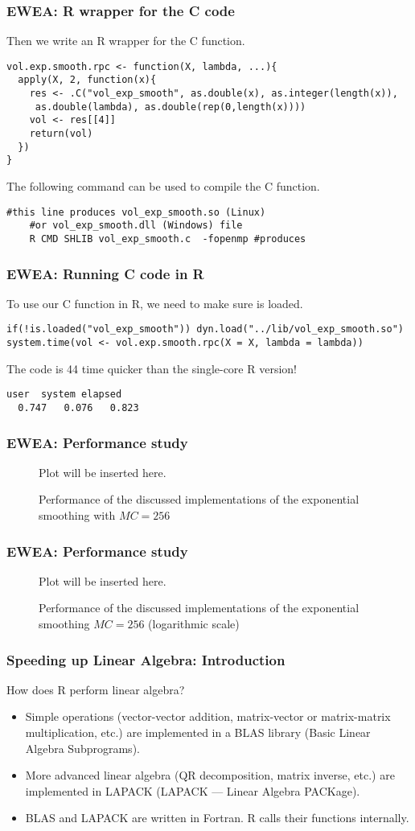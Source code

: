 \documentclass[handout]{beamer}
\newif\ifplot
\newcommand{\tikzfigure}[2]{

	\begin{figure}[h!]
		\ifplot  	
			\resizebox{0.9\textwidth}{!}{}
		\else
			Plot will be inserted here.
		\fi		
		\caption{#2}
	\end{figure} 
}
\begin{document}
\begin{frame}[fragile]
\frametitle{EWEA: R wrapper for the C code}
Then we write an R wrapper for the C function.

\begin{Verbatim}[fontsize=\footnotesize]
vol.exp.smooth.rpc <- function(X, lambda, ...){  
  apply(X, 2, function(x){    
    res <- .C("vol_exp_smooth", as.double(x), as.integer(length(x)),
     as.double(lambda), as.double(rep(0,length(x))))
    vol <- res[[4]]    
    return(vol)
  })
}
\end{Verbatim}

The following command can be used to compile the C function.
\begin{Verbatim}[fontsize=\footnotesize]
	#this line produces vol_exp_smooth.so (Linux)
	#or vol_exp_smooth.dll (Windows) file
	R CMD SHLIB vol_exp_smooth.c  -fopenmp #produces 
\end{Verbatim}

\end{frame}

\begin{frame}[fragile]
\frametitle{EWEA: Running C code in R}
	To use our C function in R, we need to make sure is loaded.
\begin{Verbatim}[fontsize=\footnotesize]
if(!is.loaded("vol_exp_smooth")) dyn.load("../lib/vol_exp_smooth.so")
system.time(vol <- vol.exp.smooth.rpc(X = X, lambda = lambda))
\end{Verbatim}
The code is 44 time quicker than the single-core R version!
\begin{Verbatim}[fontsize=\footnotesize]
   user  system elapsed 
  0.747   0.076   0.823 
\end{Verbatim}  
\end{frame}
\begin{frame}
	\frametitle{EWEA: Performance study}
		\tikzfigure{vol_exp_smooth_normalscale}{Performance of the discussed implementations of the exponential smoothing with $MC=256$ }
\end{frame}


\begin{frame}
	\frametitle{EWEA: Performance study}
		\tikzfigure{vol_exp_smooth_logscale}{Performance of the discussed implementations of the exponential smoothing  $MC=256$ (logarithmic scale)}
\end{frame}

\begin{frame}
	\frametitle{Speeding up Linear Algebra: Introduction}
	
	How does R perform linear algebra?
	\begin{itemize}
		\item Simple operations (vector-vector addition, matrix-vector or matrix-matrix multiplication, etc.) are implemented in a BLAS library (Basic Linear Algebra Subprograms).
		\item More advanced linear algebra (QR decomposition, matrix inverse, etc.) are implemented in LAPACK (LAPACK — Linear Algebra PACKage).
		\item BLAS and LAPACK are written in Fortran. R calls their functions internally. 
	\end{itemize}
\end{frame}
\end{document}
